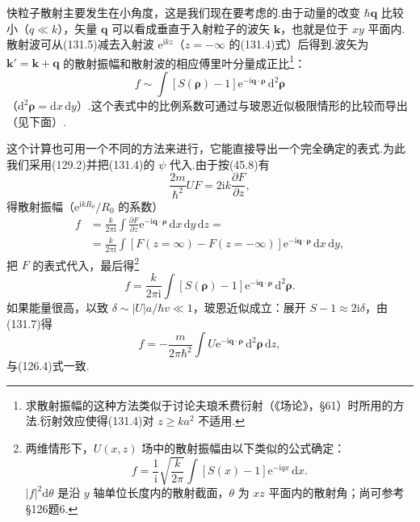 快粒子散射主要发生在小角度，这是我们现在要考虑的.由于动量的改变 $\hbar\boldsymbol{q}$ 比较小（$q\ll k$），矢量 $\boldsymbol{q}$ 可以看成垂直于入射粒子的波矢 $\boldsymbol{k}$，也就是位于 $xy$ 平面内.散射波可从(131.5)减去入射波 $\mathrm{e}^{\mathrm{i}kz}$（$z=-\infty$ 的(131.4)式）后得到.波矢为 $\boldsymbol{k}'=\boldsymbol{k}+\boldsymbol{q}$ 的散射振幅和散射波的相应傅里叶分量成正比\footnote{求散射振幅的这种方法类似于讨论夫琅禾费衍射（《场论》，§61）时所用的方法.衍射效应使得(131.4)对 $z\geqslant ka^2$ 不适用.}：
\begin{equation*}
  f\sim\int\left[S(\boldsymbol{\rho})-1\right]
  \mathrm{e}^{-\mathrm{i}\boldsymbol{q}\cdot\boldsymbol{\rho}}\,
  \mathrm{d}^2\boldsymbol{\rho}
\end{equation*}
（$\mathrm{d}^2\boldsymbol{\rho}=\mathrm{d}x\,\mathrm{d}y$）.这个表式中的比例系数可通过与玻恩近似极限情形的比较而导出（见下面）.

这个计算也可用一个不同的方法来进行，它能直接导出一个完全确定的表式.为此我们采用(129.2)并把(131.4)的 $\psi$ 代入.由于按(45.8)有
\begin{equation*}
  \frac{2m}{\hbar^2}UF=2\mathrm{i}k\frac{\partial F}{\partial z},
\end{equation*}
得散射振幅（$\mathrm{e}^{\mathrm{i}kR_0}/R_0$ 的系数）
\begin{equation*}
\begin{aligned}
  f&=\frac{k}{2\pi\mathrm{i}}\int\frac{\partial F}{\partial z}
  \mathrm{e}^{-\mathrm{i}\boldsymbol{q}\cdot\boldsymbol{\rho}}\,
  \mathrm{d}x\,\mathrm{d}y\,\mathrm{d}z=\\
  &=\frac{k}{2\pi\mathrm{i}}\int
  \left[F(z=\infty)-F(z=-\infty)\right]
  \mathrm{e}^{-\mathrm{i}\boldsymbol{q}\cdot\boldsymbol{\rho}}\,
  \mathrm{d}x\,\mathrm{d}y,
\end{aligned}
\end{equation*}
把 $F$ 的表式代入，最后得\footnote{两维情形下，$U(x,z)$ 场中的散射振幅由以下类似的公式确定：
\begin{equation*}
  f=\frac{1}{\mathrm{i}}\sqrt{\frac{k}{2\pi}}\int\left[S(x)-1\right]\mathrm{e}^{-\mathrm{i}qx}\,\mathrm{d}x.
  \tag{131.7a}
\end{equation*}
$|f|^2\mathrm{d}\theta$ 是沿 $y$ 轴单位长度内的散射截面，$\theta$ 为 $xz$ 平面内的散射角；尚可参考§126题6.}
\begin{equation}
  f=\frac{k}{2\pi\mathrm{i}}\int\left[S(\boldsymbol{\rho})-1\right]
  \mathrm{e}^{-\mathrm{i}\boldsymbol{q}\cdot\boldsymbol{\rho}}\,
  \mathrm{d}^2\boldsymbol{\rho}.
\end{equation}
如果能量很高，以致 $\delta\sim|U|a/\hbar v\ll1$，玻恩近似成立：展开 $S-1\approx2\mathrm{i}\delta$，由(131.7)得
\begin{equation*}
  f=-\frac{m}{2\pi\hbar^2}\int U
  \mathrm{e}^{-\mathrm{i}\boldsymbol{q}\cdot\boldsymbol{\rho}}\,
  \mathrm{d}^2\boldsymbol{\rho}\,\mathrm{d}z,
\end{equation*}
与(126.4)式一致.

